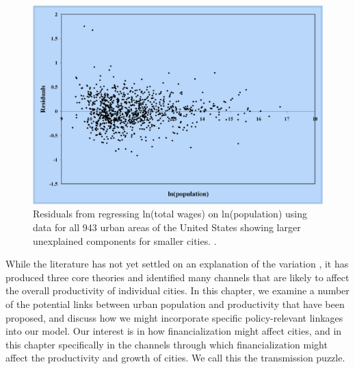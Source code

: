 



\begin{figure}
\centering
\includegraphics[scale=0.30]{fig/residuals-lobo.png}
\caption{Residuals from regressing ln(total wages) on ln(population) using data for all 943 urban areas of the United States showing larger unexplained components for smaller cities. \cite{loboUrbanScalingProduction2013}.}
\label{fig-residuals-lobo}
\end{figure}

While the literature has not yet settled on an explanation of the variation \cite{loboUrbanScalingProduction2013}, it has produced three core theories and identified many channels that are likely to affect the overall productivity of individual cities. %
In this chapter, we examine a number of the potential links between urban population and productivity that have been proposed, and discuss how we might incorporate specific policy-relevant linkages into our model. Our interest is in how financialization might affect cities, and in this chapter specifically in the channels through which financialization might affect the productivity and growth of cities. We call this \gls{the transmission puzzle}.

